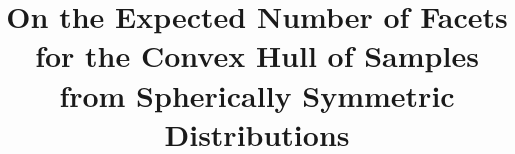 \documentclass[conference,a4paper]{IEEEtran}
\begin{document}
\title{On the Expected Number of Facets for the Convex Hull of Samples from Spherically Symmetric Distributions} 

\author{%
}

%
%
%
%
\end{document}
